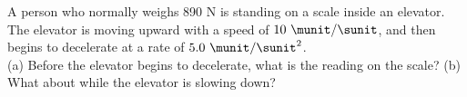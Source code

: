 A person who normally weighs 890 N is standing on a scale inside
an elevator. The elevator is moving upward with a speed of $10\ \munit/\sunit$,
and then begins to decelerate at a rate of $5.0\ \munit/\sunit^2$.\\
%
(a) Before the elevator begins to decelerate, what is the reading on the scale?
%
(b) What about while the elevator is slowing down?
